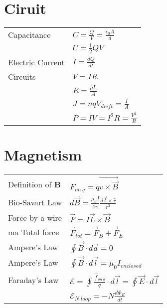 \documentclass[5pt]{article}
\begin{document}
\begin{multicols}{2}
\section{Ciruit}
\begin{tabular}{ll}
Capacitance      & $C=\frac{Q}{V}=\frac{\epsilon_0A}{d}$\\
                 & $U=\frac{1}{2}QV$\\
Electric Current & $I=\frac{dQ}{dt}$\\
Circuits         & $V=IR$\\
                 & $R=\frac{\rho L}{A}$\\
                 & $J=nqV_{drift}=\frac{I}{A}$\\
                 & $P=IV=I^2R=\frac{V^2}{R}$\\
\end{tabular}


\section{Magnetism}
\begin{tabular}{ll}
Definition of \textbf{B} & $F_{on\:q}=q\vec{v\times\vec{B}}$\\
Bio-Savart Law & $d\Vec{B}=\frac{\mu_0I}{4\pi}\frac{d\Vec{l}\times\hat{r}}{r^2}$\\
Force by a wire & $\vec{F}=I\vec{L}\times\vec{B}$\\
ma
Total force & $\vec{F}_{tot}=\vec{F}_{B} + \vec{F}_{E}$\\
Ampere's Law & $\oint\Vec{B}\cdot d\vec{a}=0$\\
Ampere's Law & $\oint\Vec{B}\cdot d\vec{l}=\mu_0I_{enclosed}$\\
Faraday's Law & $\mathcal{E}=\oint \frac{\vec{f}_{on\:q}}{q}\cdot d\vec{l}=\oint \vec{E}\cdot d\vec{l}$\\
              & $\mathcal{E}_{N\;loop}=-N\frac{d\Phi_B}{dt}$\\
              

\end{tabular}



\end{multicols}
\end{document}
